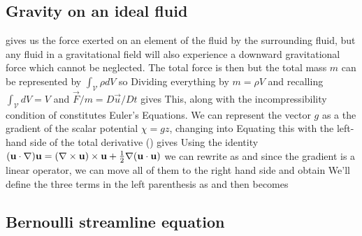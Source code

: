 \documentclass[12pt]{book}
\begin{document}
\subsection{Gravity on an ideal fluid}
 gives us the force exerted on an element of the fluid by the surrounding fluid, but any fluid in a gravitational field will also experience a downward gravitational force which cannot be neglected.   The total force is then
but the total mass $m$ can be represented by $\int_{\mathcal{V}}\rho d V$ so
Dividing everything by $m=\rho V$ and recalling $\int_{\mathcal V} dV = V $ and $ \vec F/m  = D\vec u /Dt$ gives 
This, along with the incompressibility condition of  constitutes Euler's Equations.
We can represent the vector $g$ as a the gradient of the scalar potential $\chi=gz$, changing  into 
Equating this with the left-hand side of the total derivative () gives
Using the identity $(\vec u \cdot \Nabla)\vec u = (\Nabla\cross\vec u )\cross\vec u +\frac{1}{2} \Nabla(\vec u \cdot \vec u)$
we can rewrite  as
and since the gradient is a linear operator, we can move all of them to the right hand side and obtain
We'll define the three terms in the left parenthesis as 
and then  becomes

\subsection{Bernoulli streamline equation}
\end{document}

